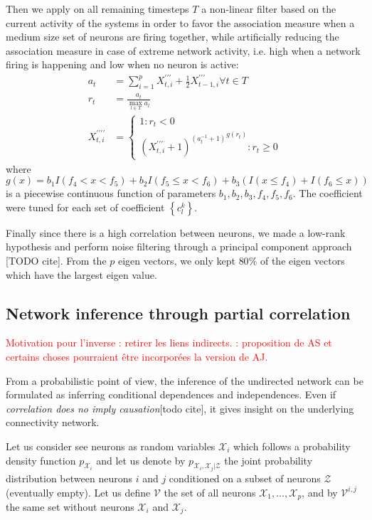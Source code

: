 \documentclass[wcp]{jmlr}
\begin{document}
Then we apply on all remaining timesteps $T$ a non-linear filter based on the current
activity of the systems in order to favor the association measure when
a medium size set of neurons are firing together, while artificially
reducing the association measure in case of extreme network activity,
i.e. high when a network firing is happening and low when no neuron is
active:
\begin{align}
a_t &= \sum_{i=1}^p X^{\prime\prime\prime}_{t,i} +
                   \frac{1}{2} X^{\prime\prime\prime}_{t-1,i} \forall t \in T\\
r_t &= \frac{a_t}{\max_{l \in T}{a_l}} \\
X^{\prime\prime\prime\prime}_{t,i} &=
\left\{
  \begin{array}{l}
    1  : r_t < 0\\
    {(X^{\prime\prime\prime}_{t,i} + 1)^{(a_t^{-1} + 1)}}^{g(r_t)} : r_t \geq 0
  \end{array}
\right.
\end{align}
where $g(x) = b_1 I(f_4 < x < f_5) + b_2  I(f_5 \leq x < f_6) +
b_3 (I(x\leq f_4) + I(f_ 6 \leq x))$ is a piecewise continuous function of
parameters $b_1, b_2, b_3, f_4, f_5, f_6$. The coefficient were tuned
for each set of coefficient $\left\{c_l^k\right\}$.

Finally since there is a high correlation between neurons, we made a
low-rank hypothesis and perform noise filtering through a principal component
approach [TODO cite]. From the $p$ eigen vectors, we only kept $80\%$ of
the eigen vectors which have the largest eigen value.

\subsection{Network inference through partial correlation}
\label{sec:inference}


\textcolor{red}{Motivation pour l'inverse : retirer les liens indirects.
\Pareil: proposition de AS  et certains choses pourraient être incorporées
\dans la version de AJ.}

From a probabilistic point of view, the inference of the undirected network
can be formulated as inferring conditional dependences and independences. Even
if \textit{correlation does no imply causation}[todo cite], it gives insight
on the underlying connectivity network.

Let us consider see neurons as random variables $\mathcal{X}_i$ which follows
a probability density function $p_{\mathcal{X}_i}$ and let us denote by
$p_{\mathcal{X}_i,\mathcal{X}_j|\mathcal{Z}}$ the joint probability
distribution between neurons $i$ and $j$ conditioned on a subset of neurons
$\mathcal{Z}$ (eventually empty). Let us define $\mathcal{V}$ the set of all
neurons $\mathcal{X}_1, \dots, \mathcal{X}_p$, and by $\mathcal{V}^{i,j}$ the
same set without neurons $\mathcal{X}_i$ and $\mathcal{X}_j$.
\end{document}
